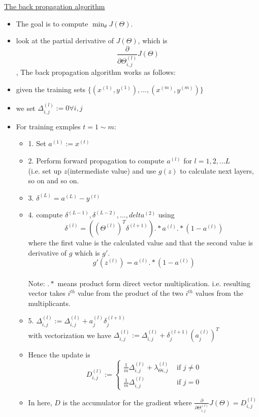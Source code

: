\documentclass[12pt]{article}
\begin{document}
\underline{The back propagation algorithm}
\begin{itemize}
	\item The goal is to compute $\min_\theta J(\Theta)$.
	\item look at the partial derivative of $J(\Theta)$, which is
	\[ \frac{\partial}{\partial\Theta_{i,j}^{(l)}} J(\Theta)\], The back propagation algorithm works as follows:
	\item given the training sets $\{ (x^{(1)},y^{(1)}),\ldots , (x^{(m)},y^{(m)}) \}$
	\item we set $\Delta _{i,j}^{(l)} :=0 \forall i,j$
	\item For training exmples $t=1 \sim m$:
	\begin{itemize}
		\item 1.  Set $a^{(1)}:=x^{(t)}$\\
		\item 2. Perform forward propagation to compute $a^{(l)}$ for $l=1,2,\ldots L$\\
		(i.e. set up $z$(intermediate value) and use $g(z)$ to calculate next layers, so on and so on.\\
		\item 3. $\delta^{(L)} = a^{(L)} - y^{(t)}$\\
		\item 4. compute $\delta^{(L-1)}, \delta^{(L-2)},\ldots, delta^{(2)}$ using 
		\[\delta^{(l)} = ((\Theta^{(l)}) ^T\delta^{(l+1)}) .* a^{(l)} .*(1-a^{(l)}) \]
		where the first value is the calculated value 
		and that the second value is derivative of $g$ which is $g'$.
		\[g'(z^{(l)} ) =a^{(l)} .*(1-a^{(l)})\]\\ Note: $.*$ means product form direct vector multiplication. i.e. resulting vector takes $i^{th}$ value from the product of the two $i^{th}$ values from the multiplicants.\\
		\item 5. $\Delta_{i,j}^{(l)} := \Delta_{i,j}^{(l)} + a_j^{(l)}\delta_j^{(l+1)}$\\ with vectorization we have $\Delta_{i,j}^{(l)} := \Delta_{i,j}^{(l)} + \delta_j^{(l+1)}(a_j^{(l)})^T$
		\item Hence the update is \[
		D_{i,j}^{(l)} :=\left\{
		\begin{array}{ll}
		\frac{1}{m} \Delta_{i,j}^{(l)}+\lambda_{\Theta i,j}^{(l)}&\text{ if }j\neq 0\\
		\frac{1}{m}\Delta_{i,j}^{(l)} &\text{ if } j=0
		\end{array}
		\right.
		\]
		\item In here, $D$ is the accumulator for the gradient where $\frac{\partial}{\partial\Theta_{i,j}^{(l)}} J(\Theta) = D_{i,j}^{(l)}$

\end{itemize}
\end{itemize}
\end{document}
